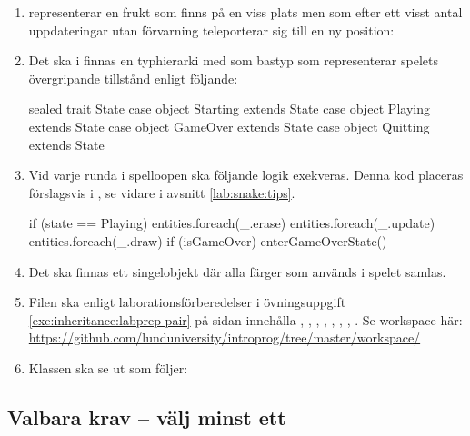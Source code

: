\begin{enumerate}[label={$\square$}, leftmargin=*]
\item {} representerar en frukt som finns på en viss plats men som efter ett visst antal uppdateringar utan förvarning teleporterar sig till en ny position:

\item Det ska i  finnas en typhierarki med  som bastyp som representerar spelets övergripande tillstånd enligt följande:
\begin{Code}
sealed trait State
case object Starting extends State
case object Playing  extends State
case object GameOver extends State
case object Quitting extends State
\end{Code}

\item Vid varje runda i spelloopen ska följande logik exekveras. Denna kod placeras förslagsvis i , se vidare  i avsnitt \ref{lab:snake:tips}.
\begin{Code}
if (state == Playing) {
  entities.foreach(_.erase)
  entities.foreach(_.update)
  entities.foreach(_.draw)
  if (isGameOver) enterGameOverState()
}
\end{Code}

\item Det ska finnas ett singelobjekt  där alla färger som används i spelet samlas.

\item Filen  ska enligt laborationsförberedelser i övningsuppgift   \ref{exe:inheritance:labprep-pair} på sidan \pageref{exe:inheritance:labprep-pair} innehålla
, , , , , , , . Se workspace här:\\
\url{https://github.com/lunduniversity/introprog/tree/master/workspace/}

\item Klassen  ska se ut som följer:

\end{enumerate}





\subsection{Valbara krav -- välj minst ett}\label{lab:snake:extra-reqts}

